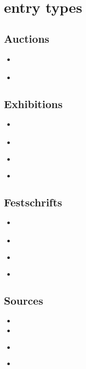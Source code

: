 \documentclass[a4paper,12pt]{scrartcl}
\begin{document}
\section{entry types}

\subsection{Auctions}
\begin{itemize}
    \item\cite{hesse:c:1995}%
    \item{}
\end{itemize}

\subsection{Exhibitions}
\begin{itemize}
    \item\cite{schaedler:1999}%
    \item{}%
    \item\cite{oberlechner:1999}%
    \item{}%
\end{itemize}


\subsection{Festschrifts}
\begin{itemize}
    \item\cite{kronsbein:siepen:2015}%
    \item{}%
    \item\cites{auler:hiller:2015a}%
    \item{}%
\end{itemize}

\subsection{Sources}
\begin{itemize}
    \item{}
    \item{}
    \item\cites{test::source}%
    \item{}%
\end{itemize}
\end{document}
